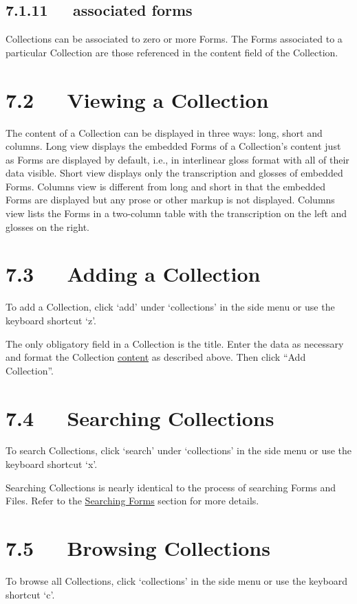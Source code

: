 \documentclass[letterpaper,10pt,english]{sphinxmanual}
\begin{document}
\subsection{7.1.11   associated forms}
\label{documentation:associated-forms}
Collections can be associated to zero or more Forms.  The Forms associated to a
particular Collection are those referenced in the content field of the
Collection.


\section{7.2   Viewing a Collection}
\label{documentation:viewing-a-collection}
The content of a Collection can be displayed in three ways: long, short and
columns.  Long view displays the embedded Forms of a Collection's content just
as Forms are displayed by default, i.e., in interlinear gloss format with all of
their data visible.  Short view displays only the transcription and glosses of
embedded Forms.  Columns view is different from long and short in that the
embedded Forms are displayed but any prose or other markup is not displayed.
Columns view lists the Forms in a two-column table with the transcription on the
left and glosses on the right.


\section{7.3   Adding a Collection}
\label{documentation:adding-a-collection}
To add a Collection, click `add' under `collections' in the side menu or use the
keyboard shortcut `z'.

The only obligatory field in a Collection is the title.  Enter the data as
necessary and format the Collection {\hyperref[documentation:content]{content}} as described above.  Then click
``Add Collection''.


\section{7.4   Searching Collections}
\label{documentation:searching-collections}
To search Collections, click `search' under `collections' in the side menu or
use the keyboard shortcut `x'.

Searching Collections is nearly identical to the process of searching Forms and
Files.  Refer to the {\hyperref[documentation:searching-forms]{Searching Forms}} section for more details.


\section{7.5   Browsing Collections}
\label{documentation:browsing-collections}
To browse all Collections, click `collections' in the side menu or use the
keyboard shortcut `c'.
\end{document}
